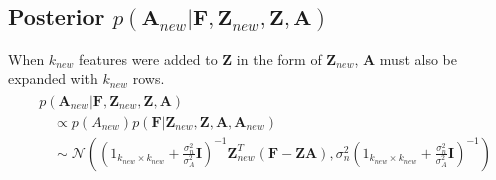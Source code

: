 \documentclass[]{article}
\begin{document}
	
\subsection{Posterior $p(\mathbf{A}_{new}| \mathbf{F}, \mathbf{Z}_{new}, \mathbf{Z}, \mathbf{A})$}
	When $k_{new}$ features were added to $\mathbf{Z}$ in the form of $\mathbf{Z}_{new}$, $\mathbf{A}$ must also be expanded with $k_{new}$ rows. 
	\begin{align}
		\begin{split}\label{eq:posterior_Anew}
			&p(\mathbf{A}_{new}| \mathbf{F}, \mathbf{Z}_{new}, \mathbf{Z}, \mathbf{A}) \\
			&\quad \propto p(A_{new}) p(\mathbf{F} | \mathbf{Z}_{new}, \mathbf{Z}, \mathbf{A}, \mathbf{A}_{new}) \\
			&\quad \sim \mathcal{N}\left( \left(1_{k_{new}\times k_{new}}  + \frac{\sigma^2_n}{\sigma^2_A}\mathbf{I}\right)^{-1} \mathbf{Z}^T_{new} (\mathbf{F} - \mathbf{Z} \mathbf{A}), \sigma^2_n \left(1_{k_{new}\times k_{new}}  + \frac{\sigma^2_n}{\sigma^2_A}\mathbf{I}\right)^{-1}  \right)
		\end{split}
	\end{align}
\end{document}
